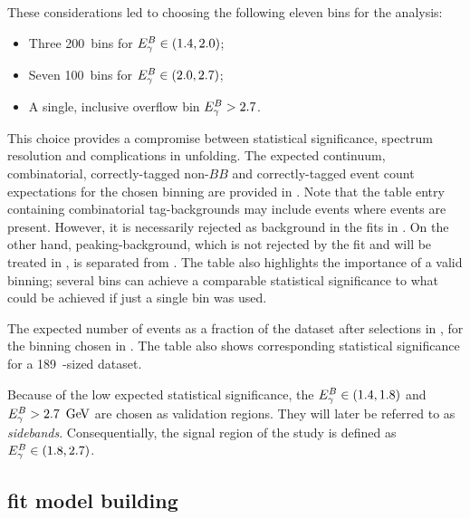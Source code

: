 These considerations led to choosing the following eleven \EB bins for the analysis:
\begin{itemize}
    \item Three 200~\mev bins for ${E^B_{\gamma}}\in(1.4,2.0)$;
    \item Seven 100~\mev bins for ${E^B_{\gamma}}\in(2.0,2.7)$;
    \item A single, inclusive overflow bin ${E^B_{\gamma}}>2.7$.
\end{itemize}
This choice provides a compromise between statistical significance, \EB spectrum resolution and complications in unfolding.
The expected continuum, combinatorial, correctly-tagged non-\BtoXsgamma $BB$ and correctly-tagged \BtoXsgamma event count expectations for the chosen binning are provided in .
Note that the table entry containing combinatorial tag-\B backgrounds may include events where \BtoXsgamma events are present.
However, it is necessarily rejected as background in the \Mbc fits in .
On the other hand, peaking-\BB background, which is not rejected by the \Mbc fit and will be treated in , is separated from \BtoXsgamma.
The table also highlights the importance of a valid binning; several bins can achieve a comparable statistical significance to what could be achieved if just a single bin was used.

\begin{table}[htbp!]
    \caption{\label{tab:expected_events}
    The expected number of events as a fraction of the dataset after selections in , for the binning chosen in .
    The table also shows corresponding statistical significance for a 189~\invfb-sized dataset.
    }
    
\end{table}

Because of the low expected statistical significance, the ${E^B_{\gamma}}\in(1.4,1.8)$ and ${E^B_{\gamma}}>2.7~\mathrm{\,Ge\kern -0.1em V}$ are chosen as validation regions.
They will later be referred to as \textit{sidebands}.
Consequentially, the signal region of the study is defined as ${E^B_{\gamma}}\in(1.8,2.7)$.

\subsection{\texorpdfstring{\Mbc}{Mbc} fit model building}\label{sec:fitting_setup}

